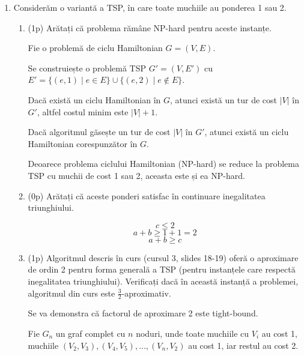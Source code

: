 \documentclass[a4paper,12pt]{article}
\begin{document}
\begin{enumerate}

      \item
            Considerăm o variantă a TSP, în care toate muchiile au ponderea 1
            sau 2.

            \begin{enumerate}

                  \item (1p)
                        Arătați că problema rămâne NP-hard pentru aceste instanțe.

                        Fie o problemă de ciclu Hamiltonian $G = (V, E)$.

                        Se construiește o problemă TSP $G' = (V, E')$ cu $E' = \{(e, 1) \mid e \in E\} \cup \{(e, 2) \mid e \notin E\}$.

                        Dacă există un ciclu Hamiltonian în $G$, atunci există un tur de cost $|V|$ în $G'$,
                        altfel costul minim este $|V| + 1$.

                        Dacă algoritmul găsește un tur de cost $|V|$ în $G'$,
                        atunci există un ciclu Hamiltonian corespunzător în $G$.

                        Deoarece problema ciclului Hamiltonian (NP-hard) se reduce la problema TSP cu muchii de cost 1 sau 2,
                        aceasta este și ea NP-hard.

                  \item (0p)
                        Arătați că aceste ponderi satisfac în continuare inegalitatea triunghiului.

                        \[c \leq 2\]
                        \[a + b \geq 1 + 1 = 2\]
                        \[a + b \geq c\]

                  \item (1p)
                        Algoritmul descris în curs (cursul 3, slides 18-19) oferă o aproximare
                        de ordin 2 pentru forma generală a TSP (pentru instanțele care respectă
                        inegalitatea triunghiului). Verificați dacă în această instanță
                        a problemei, algoritmul din curs este $\frac{3}{2}$-aproximativ.

                        Se va demonstra că factorul de aproximare 2 este tight-bound.

                        Fie $G_n$ un graf complet cu $n$ noduri, unde toate muchiile cu $V_i$ au cost 1,
                        muchiile $(V_2, V_3), (V_4, V_5), \dots, (V_{n}, V_2)$ au cost 1, iar restul au cost 2.


\end{enumerate}
\end{enumerate}
\end{document}
